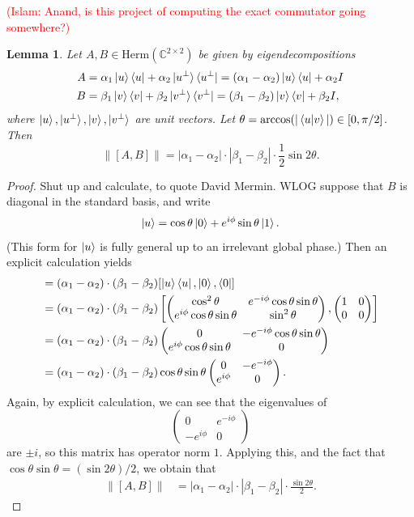 \documentclass[11pt]{article}
\theoremstyle{plain}
\newtheorem{lemma}[theorem]{Lemma}
\newcommand{\IslamNote}[1]{\textcolor{red}{(Islam: #1)}}
\newcommand{\IslamNote}[1]{}
\begin{document}
\IslamNote{Anand, is this project  of computing the exact commutator going somewhere?}

\begin{lemma}
    Let $A, B \in \mathrm{Herm}(\mathbb{C}^{2 \times 2})$ be given by eigendecompositions
    \begin{align}
        A &= \alpha_1 \ket{u}\bra{u} + \alpha_2 \ket{u^\perp}\bra{u^\perp} = (\alpha_1 - \alpha_2) \ket{u}\bra{u} + \alpha_2 I \\
        B &= \beta_1 \ket{v}\bra{v} + \beta_2\ket{v^\perp}\bra{v^\perp} = (\beta_1 - \beta_2) \ket{v}\bra{v} + \beta_2 I,
    \end{align}
    where $\ket{u}, \ket{u^\perp}, \ket{v}, \ket{v^\perp}$ are unit vectors.
    Let $\theta = \arccos(|\braket{u|v}|) \in [0, \pi/2]$. Then
    \[ \|[A,B] \| = |\alpha_1 - \alpha_2| \cdot |\beta_1 - \beta_2| \cdot \frac{1}{2} \sin 2\theta. \]
\end{lemma}
\begin{proof}
    Shut up and calculate, to quote David Mermin. WLOG suppose that $B$ is diagonal in the standard basis, and write
    \[ \ket{u} = \cos \theta \ket{0} + e^{i \phi} \sin\theta \ket{1}.\]
    (This form for $\ket{u}$ is fully general up to an irrelevant global phase.) Then an explicit calculation yields
    \begin{align}
        [A,B] &= (\alpha_1 - \alpha_2)\cdot (\beta_1 -\beta_2) [ \ket{u}\bra{u}, \ket{0}, \bra{0}] \\
        &= (\alpha_1 - \alpha_2)\cdot (\beta_1 -\beta_2) \left[ 
        \begin{pmatrix} \cos^2\theta & e^{-i\phi} \cos\theta\sin\theta \\ e^{i\phi} \cos\theta \sin\theta & \sin^2\theta \end{pmatrix} , \begin{pmatrix} 1 & 0 \\ 0 & 0 \end{pmatrix} \right] \\
        &= (\alpha_1 - \alpha_2)\cdot (\beta_1 -\beta_2) \begin{pmatrix} 0 & -e^{-i\phi} \cos\theta \sin\theta \\ e^{i \phi} \cos\theta \sin\theta & 0 \end{pmatrix} \\
        &= (\alpha_1 - \alpha_2)\cdot (\beta_1 -\beta_2) \cos\theta \sin\theta \begin{pmatrix} 0 & -e^{-i\phi} \\ e^{i\phi} & 0 \end{pmatrix}.
    \end{align}
    Again, by explicit calculation, we can see that the eigenvalues of
    \[ \begin{pmatrix} 0 & e^{-i\phi} \\ -e^{i\phi} & 0 \end{pmatrix}\]
    are $\pm i$, so this matrix has operator norm $1$. Applying this, and the fact that $\cos\theta \sin\theta = (\sin 2\theta)/2$, we obtain that
    \begin{align}
        \| [A,B] \| &= |\alpha_1 - \alpha_2| \cdot |\beta_1 - \beta_2| \cdot \frac{\sin 2\theta}{2}. 
    \end{align}
\end{proof}
\end{document}
